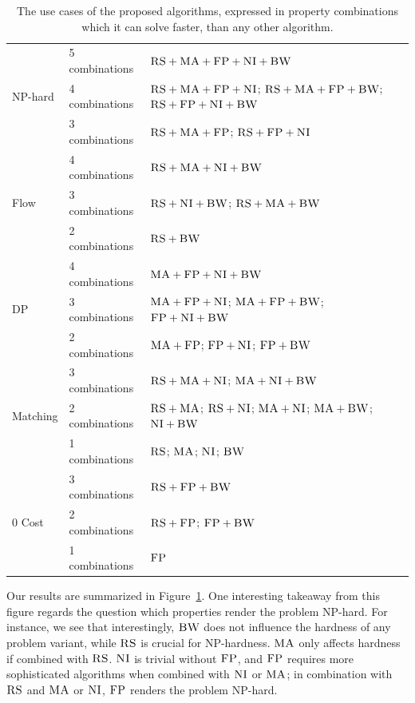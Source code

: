 \documentclass[9pt]{sigcomm-alternate}
\newcommand{\CC}{\textsc{NI}}
\newcommand{\FP}{\textsc{FP}}
\newcommand{\RS}{\textsc{RS}}
\newcommand{\BW}{\textsc{BW}}
\newcommand{\MA}{\textsc{MA}}
\begin{document}
\begin{table}


\begin{small}
\begin{tabular}{|l|l|p{4cm}|}
\hline
\multirow{3}{*}{NP-hard} & 5 combinations & \mbox{$\RS+\MA+\FP+\CC+\BW$}\\
\cline{2-3}
 & 4 combinations &  \mbox{$\RS+\MA+\FP+\CC$}; \mbox{$\RS+\MA+\FP+\BW$};
\mbox{$\RS+\FP+\CC+\BW$} \\ \cline{2-3}
 & 3 combinations &\mbox{$\RS+\MA+\FP$}; \mbox{$\RS+\FP+\CC$} \\
 \hline
 \hline
\multirow{3}{*}{Flow} & 4 combinations & \mbox{$\RS+\MA+\CC+\BW$} \\ \cline{2-3}
 & 3 combinations & \mbox{$\RS+\CC+\BW$}; \mbox{$\RS+\MA+\BW$}    \\ \cline{2-3}
 & 2 combinations &$\RS+\BW$ \\
 \hline
 \hline
\multirow{3}{*}{DP} & 4 combinations & \mbox{$\MA+\FP+\CC+\BW$} \\ \cline{2-3}
 & 3 combinations &   \mbox{$\MA+\FP+\CC$};
\mbox{$\MA+\FP+\BW$}; \mbox{$\FP+\CC+\BW$} \\ \cline{2-3}
 & 2 combinations &\mbox{$\MA+\FP$}; \mbox{$\FP+\CC$};
\mbox{$\FP+\BW$} \\
 \hline
 \hline
\multirow{3}{*}{Matching} &3 combinations&
\mbox{$\RS+\MA+\CC$}; \mbox{$\MA+\CC+\BW$}  \\
\cline{2-3}
 & 2 combinations & \mbox{$\RS+\MA$};
\mbox{$\RS+\CC$}; \mbox{$\MA+\CC$};
\mbox{$\MA+\BW$}; \mbox{$\CC+\BW$} \\ \cline{2-3}
& 1 combinations & \mbox{$\RS$}; \mbox{$\MA$};
\mbox{$\CC$}; \mbox{$\BW$}\\
 \hline
 \hline
 \multirow{3}{*}{0 Cost} & 3 combinations & \mbox{$\RS+\FP+\BW$}\\
\cline{2-3}
 & 2 combinations & \mbox{$\RS+\FP$}; \mbox{$\FP+\BW$}
\\ \cline{2-3}
 & 1 combinations & \mbox{$\FP$}\\
 \hline
\end{tabular}
\end{small}
\caption{The use cases of the proposed algorithms, expressed in property
combinations which it can solve faster, than any other algorithm.}
\label{tab:summary}
\end{table}


Our results are summarized in
Figure~\ref{tab:summary}.
One interesting takeaway from this figure regards
the question which properties render the problem
NP-hard. For instance, we see that interestingly, $\BW$
does not influence the hardness of any problem variant,
while $\RS$ is crucial for NP-hardness.
$\MA$ only affects hardness if combined with $\RS$.
$\CC$ is trivial without $\FP$, and $\FP$ requires
more sophisticated algorithms when combined with $\CC$ or $\MA$;
in combination with $\RS$ and $\MA$ or $\CC$, $\FP$ renders the
problem NP-hard.
\end{document}
